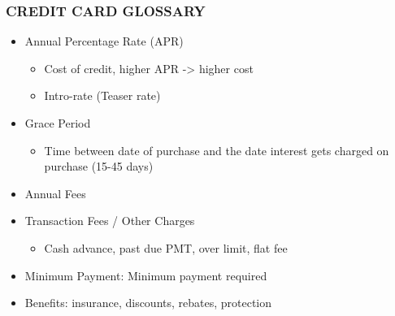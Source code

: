 \documentclass[12pt]{article}
\begin{document}
                \subsubsection{CREDIT CARD GLOSSARY}
                    \begin{itemize}
                        \item Annual Percentage Rate (APR)
                            \begin{itemize}
                                \item Cost of credit, higher APR -> higher cost
                                \item Intro-rate (Teaser rate)
                            \end{itemize}
                        \item Grace Period
                            \begin{itemize}
                                \item Time between date of purchase and the date interest gets charged on purchase (15-45 days)
                            \end{itemize}
                        \item Annual Fees
                        \item Transaction Fees / Other Charges
                            \begin{itemize}
                                \item Cash advance, past due PMT, over limit, flat fee
                            \end{itemize}
                        \item Minimum Payment: Minimum payment required
                        \item Benefits: insurance, discounts, rebates, protection
                    \end{itemize}
\end{document}
